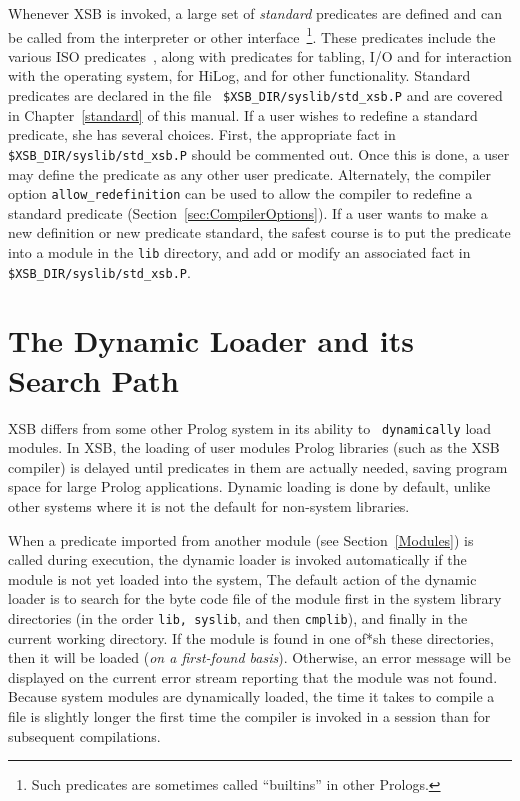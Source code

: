 Whenever XSB is invoked, a large set of {\em standard} predicates are
defined and can be called from the interpreter or other
interface~\footnote{Such predicates are sometimes called ``builtins''
in other Prologs.}.  These predicates include the various ISO
predicates~\cite{}, along with predicates for tabling, I/O and for
interaction with the operating system, for HiLog, and for other
functionality.  Standard predicates are declared in the file {\tt
\$XSB\_DIR/syslib/std\_xsb.P} and are covered in
Chapter~\ref{standard} of this manual.  If a user wishes to redefine a
standard predicate, she has several choices.  First, the appropriate
fact in {\tt \$XSB\_DIR/syslib/std\_xsb.P} should be commented out.
Once this is done, a user may define the predicate as any other user
predicate.  Alternately, the compiler option {\tt allow\_redefinition}
can be used to allow the compiler to redefine a standard predicate
(Section~\ref{sec:CompilerOptions}).  If a user wants to make a new
definition or new predicate standard, the safest course is to put the
predicate into a module in the {\tt lib} directory, and add or modify
an associated fact in {\tt \$XSB\_DIR/syslib/std\_xsb.P}.

\section{The Dynamic Loader and its Search Path} \label{LibPath}

XSB differs from some other Prolog system in its ability to {\tt
dynamically} load modules.  In XSB, the loading of user modules Prolog
libraries (such as the XSB compiler) is delayed until predicates in
them are actually needed, saving program space for large Prolog
applications.  Dynamic loading is done by default, unlike other
systems where it is not the default for non-system libraries.

When a predicate imported from another module (see
Section~\ref{Modules}) is called during execution, the dynamic loader
is invoked automatically if the module is not yet loaded into the
system, The default action of the dynamic loader is to search for the
byte code file of the module first in the system library directories
(in the order {\tt lib, syslib}, and then {\tt cmplib}), and finally
in the current working directory.  If the module is found in one of*sh
these directories, then it will be loaded ({\em on a first-found
basis}). Otherwise, an error message will be displayed on the current
error stream reporting that the module was not found.  Because system
modules are dynamically loaded, the time it takes to compile a file is
slightly longer the first time the compiler is invoked in a session
than for subsequent compilations.


